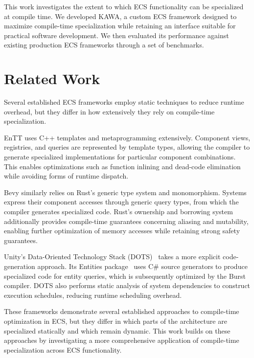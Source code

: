 \documentclass[conference]{IEEEtran}
\begin{document}
    This work investigates the extent to which ECS functionality can be specialized at compile time.
    We developed KAWA, a custom ECS framework designed to maximize compile-time specialization while retaining an
    interface suitable for practical software development.
    We then evaluated its performance against existing production ECS frameworks through a set of benchmarks.


    \section{Related Work}
    \label{sec:related-work}

    Several established ECS frameworks employ static techniques to reduce runtime overhead, but they differ in how
    extensively they rely on compile-time specialization.

    EnTT uses C++ templates and metaprogramming extensively.
    Component views, registries, and queries are represented by template types, allowing the compiler
    to generate specialized implementations for particular component combinations.
    This enables optimizations such as function inlining and dead-code elimination while avoiding forms of runtime dispatch.

    Bevy similarly relies on Rust's generic type system and monomorphism.
    Systems express their component accesses through generic query types, from which the compiler generates specialized code.
    Rust's ownership and borrowing system additionally provides compile-time guarantees concerning aliasing and mutability,
    enabling further optimization of memory accesses while retaining strong safety guarantees.

    Unity's Data-Oriented Technology Stack (DOTS)~\cite{Unity_DOTS} takes a more explicit code-generation approach.
    Its Entities package~\cite{unity_entities} uses C\# source generators to produce specialized code for entity queries,
    which is subsequently optimized by the Burst compiler.
    DOTS also performs static analysis of system dependencies to construct execution schedules,
    reducing runtime scheduling overhead.

    These frameworks demonstrate several established approaches to compile-time optimization in ECS,
    but they differ in which parts of the architecture are specialized statically and which remain dynamic.
    This work builds on these approaches by investigating a more comprehensive application of compile-time specialization across ECS functionality.
\end{document}
